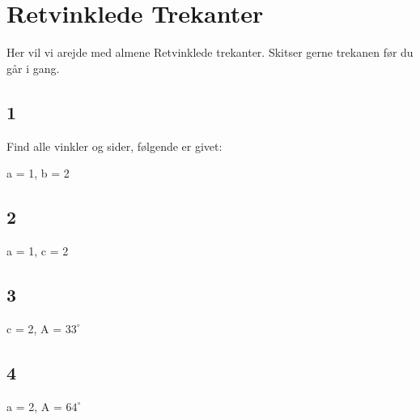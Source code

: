 \section{Retvinklede Trekanter}

Her vil vi arejde med almene Retvinklede trekanter. Skitser gerne trekanen før du går i gang.

\subsection*{1}
Find alle vinkler og sider, følgende er givet:

a = 1, b = 2

\subsection*{2}

a = 1, c = 2

\subsection*{3}

c = 2, A = $33^\circ$

\subsection*{4}
a = 2, A = $64^\circ$